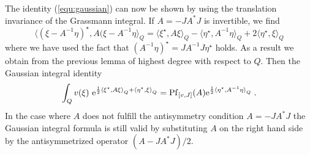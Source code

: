 \documentclass[pra,twoside,amsmath,amsfonts,amssymb,superscriptaddress,showpacs]{revtex4}
\def\8#1{{\rm #1}}
\newcommand{\RIGG}[3]{{\langle}{#1},{#2}{\rangle}_{#3}}
\newcommand{\ADJ}{\star}
\begin{document}
The identity (\ref{equ:gaussian}) can now be shown by using the translation
invariance of the Grassmann integral. If $A=-JA^*J$ is invertible, we find 
\begin{equation}
\RIGG{(\xi-A^{-1}\eta)^\ADJ}{A(\xi-A^{-1}\eta}{Q}
=\RIGG{\xi^\ADJ}{A\xi}{Q}-\RIGG{\eta^\ADJ}{A^{-1}\eta}{Q}+2\RIGG{\eta^\ADJ}{\xi}{Q}
\end{equation}
where we have used the fact that $(A^{-1}\eta)^\ADJ=JA^{-1}J\eta^\ADJ$ holds. As a result we
obtain from the previous lemma
of highest degree with respect to $Q$. Then the Gaussian integral identity 
\begin{equation}
\int_Q v(\xi) \
\8e^{\frac{1}{2}\RIGG{\xi^\ADJ}{A\xi}{Q}+\RIGG{\eta^\ADJ}{\xi}{Q}}=\8{Pf}_{[v,J]}(A)\8e^{\frac{1}{
2 }
\RIGG{\eta^\ADJ}{A^{-1}\eta}{Q}} \; .
\end{equation}
In the case where $A$ does not fulfill the antisymmetry condition  $A=-JA^*J$ the Gaussian integral
formula is still valid by substituting $A$ on the right hand side by the antisymmetrized operator
$(A-JA^*J)/2$. 
\end{document}
